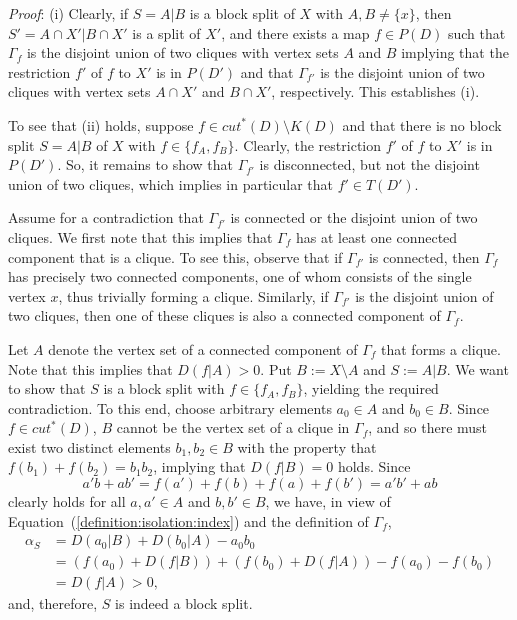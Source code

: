 \documentclass[12pt]{article}
\begin{document}
\noindent\textsl{Proof}:
(i) Clearly, if \(S=A|B\) is a block split of \(X\) with \(A,B \neq \{x\}\), then \(S' = A \cap X'| B \cap X'\) 
is a split of \(X'\), and there exists 
a map \(f \in P(D)\) such that \(\Gamma_f\) is the disjoint union of two cliques with
vertex sets \(A\) and \(B\) implying that the restriction \(f'\) of  \(f\) to \(X'\) is in \(P(D')\) and that \(\Gamma_{f'}\)
is the disjoint union of two cliques with vertex sets \(A\cap X'\) and \(B\cap X'\), respectively.
This establishes (i).

To see that (ii) holds, suppose \(f \in cut^*(D) \setminus K(D)\) and that there is no
block split \(S = A|B\) of \(X\) with \(f \in \{f_A,f_B\}\). 
Clearly, the restriction \(f'\) of \(f\) to \(X'\) is in \(P(D')\).
So, it remains to show that \(\Gamma_{f'}\) is disconnected, but 
not the disjoint union of two cliques, which implies in particular
that \(f' \in T(D')\).

Assume for a contradiction that \(\Gamma_{f'}\) is connected or
the disjoint union of two cliques. We first note that this implies that
\(\Gamma_f\) has at least one connected component that is a clique.
To see this, observe that if \(\Gamma_{f'}\) is connected,
then \(\Gamma_f\) has precisely two connected components, one of whom
consists of the single vertex \(x\), thus trivially forming a clique.
Similarly, if \(\Gamma_{f'}\) is the disjoint union of two cliques,
then one of these cliques is also a connected component of \(\Gamma_{f}\).

Let \(A\) denote the vertex set of a connected component of \(\Gamma_f\)
that forms a clique. Note that this implies that \(D(f|A)>0\).
Put \(B:=X \setminus A\) and \(S:=A|B\). 
We want to show that \(S\) is a block split with \(f \in \{f_A,f_B\}\), yielding
the required contradiction. To this end, choose arbitrary elements \(a_0 \in A\) 
and \(b_0 \in B\). Since \(f \in cut^*(D)\), \(B\) cannot be the vertex set of a
clique in \(\Gamma_f\), and so there must exist two distinct elements
\(b_1,b_2 \in B\) with the property that \(f(b_1)+f(b_2)=b_1b_2\), implying that
\(D(f|B) = 0\) holds. Since
\[a'b + ab' = f(a') + f(b) + f(a) + f(b') = a'b' + ab\]
clearly holds for all \(a,a' \in A\) and \(b,b' \in B\),
we have, in  view of Equation~(\ref{definition:isolation:index})
and the definition of \(\Gamma_f\), 
\begin{align*}
\alpha_S &= D(a_0|B) + D(b_0|A) - a_0b_0\\
         &= (f(a_0) + D(f|B)) + (f(b_0) + D(f|A)) - f(a_0) - f(b_0)\\
         &= D(f|A) > 0,
\end{align*}
and, therefore, \(S\) is indeed a block split.
\end{document}
